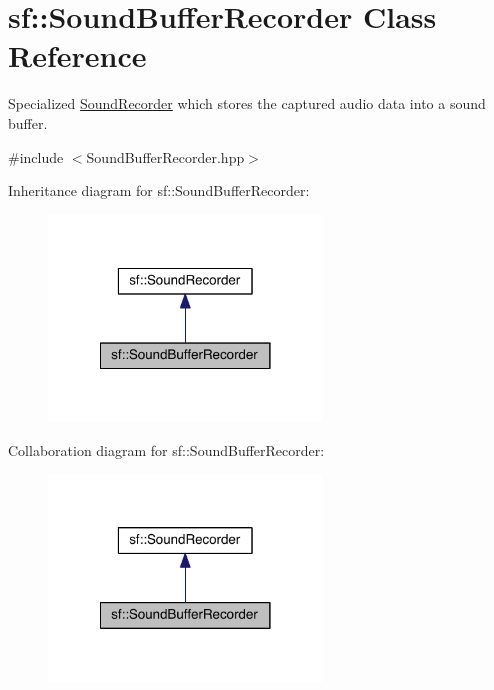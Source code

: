 \hypertarget{classsf_1_1_sound_buffer_recorder}{\section{sf\-:\-:Sound\-Buffer\-Recorder Class Reference}
\label{classsf_1_1_sound_buffer_recorder}
}


Specialized \hyperlink{classsf_1_1_sound_recorder}{Sound\-Recorder} which stores the captured audio data into a sound buffer.  




{\ttfamily \#include $<$Sound\-Buffer\-Recorder.\-hpp$>$}



Inheritance diagram for sf\-:\-:Sound\-Buffer\-Recorder\-:
\nopagebreak
\begin{figure}[H]
\begin{center}
\leavevmode
\includegraphics[width=206pt]{classsf_1_1_sound_buffer_recorder__inherit__graph}
\end{center}
\end{figure}


Collaboration diagram for sf\-:\-:Sound\-Buffer\-Recorder\-:
\nopagebreak
\begin{figure}[H]
\begin{center}
\leavevmode
\includegraphics[width=206pt]{classsf_1_1_sound_buffer_recorder__coll__graph}
\end{center}
\end{figure}

